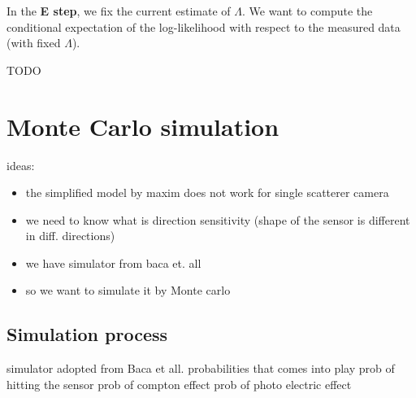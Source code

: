 In the \textbf{E step}, we fix the current estimate of $\Lambda$. 
We want to compute the conditional expectation of the log-likelihood with respect to the measured data (with fixed $\Lambda$).

TODO




\section{Monte Carlo simulation}
ideas:
\begin{itemize}
  \item the simplified model by maxim does not work for single scatterer camera
  \item we need to know what is direction sensitivity (shape of the sensor is different in diff. directions)
  \item we have simulator from baca et. all
  \item so we want to simulate it by Monte carlo
\end{itemize}

\subsection{Simulation process}
simulator adopted from Baca et all.
probabilities that comes into play
prob of hitting the sensor
prob of compton effect
prob of photo electric effect












